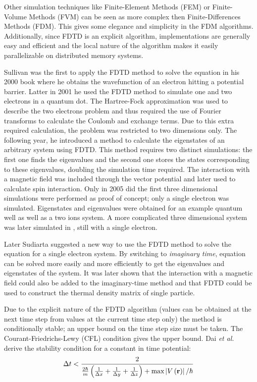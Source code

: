 Other simulation techniques like Finite-Element Methods (FEM) or Finite-Volume
Methods (FVM) can be seen as more complex then Finite-Differences Methods
(FDM). This gives some elegance and simplicity in the FDM algorithms.
Additionally, since FDTD is an explicit algorithm, implementations are
generally easy and efficient and the local nature of the algorithm makes it
easily parallelizable on distributed memory systems.

Sullivan was the first to apply the FDTD method to solve the \schrodinger
equation in his 2000 book\cite{Sullivan2000} where he obtains the wavefunction
of an electron hitting a potential barrier. Latter in 2001 he used the FDTD
method to simulate one and two electrons in a quantum dot\cite{Sullivan2001}.
The Hartree-Fock approximation was used to describe the two electrons problem
and thus required the use of Fourier transforms to calculate the Coulomb
and exchange terms. Due to this extra required calculation, the problem was
restricted to two dimensions only. The following year, he introduced a method
to calculate the eigenstates of an arbitrary system using
FDTD\cite{Sullivan2002}. This method requires two distinct simulations: the
first one finds the eigenvalues and the second one stores the states
corresponding to these eigenvalues, doubling the simulation time required.
The interaction with a magnetic field was included through the vector potential
and later\cite{Sullivan2003,Sullivan2004} used to calculate spin interaction.
Only in 2005 did the first three dimensional
simulations\cite{Sullivan2005a} were performed as proof of concept; only a
single electron was simulated. Eigenstates and eigenvalues were obtained for an
example quantum well as well as a two ions system. A more complicated three
dimensional system was later simulated in \cite{Sullivan2005b}, still with a
single electron.

Later Sudiarta suggested\cite{Sudiarta2007} a new way to use the FDTD method to
solve the \schrodinger equation for a single electron system. By switching to
\textit{imaginary time}, \schrodinger equation can be solved more easily and
more efficiently to get the eigenvalues and eigenstates of the system. It was
later shown that the interaction with a magnetic field could also be added to
the imaginary-time method\cite{Sudiarta2008} and that FDTD could be used to
construct the thermal density matrix of single particle\cite{Sudiarta2009}.

Due to the explicit nature of the FDTD algorithm (values can be obtained at the
next time step from values at the current time step only) the method is
conditionally stable; an upper bound on the time step size must be taken. The
Courant-Friedrichs-Lewy (CFL) condition gives the upper bound. Dai \textit{et
al.} derive\cite{Dai2005} the stability condition for a constant in time
potential:
\begin{align}
\Delta t < \frac{2}{
    \frac{2 \hbar}{m} \left( 
         \frac{1}{\Delta x}
        +\frac{1}{\Delta y}
        +\frac{1}{\Delta z}
         \right)
        + \textrm{max}\left| V\left( \textbf{r} \right) \right| / \hbar
    }
\end{align}


